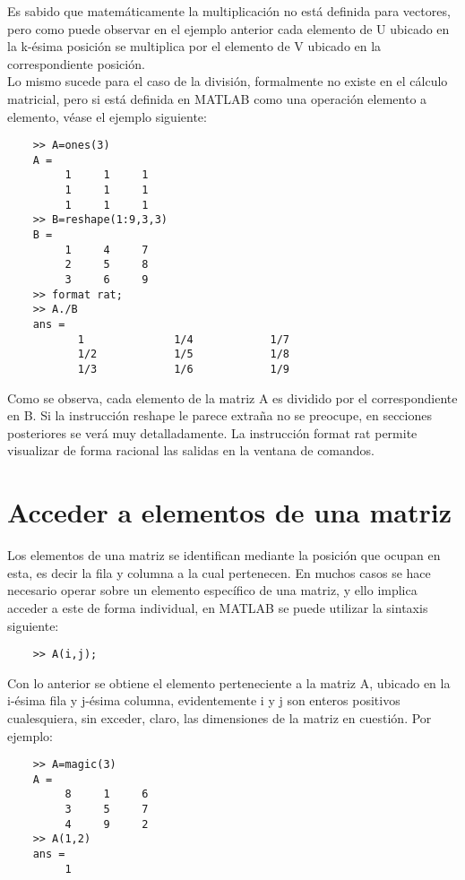 Es sabido que matemáticamente la multiplicación no está definida para vectores, pero como 
puede observar en el ejemplo anterior cada elemento de U ubicado en la k-ésima posición se 
multiplica por el elemento de V ubicado en la correspondiente posición.\\

Lo mismo sucede para el caso de la división, formalmente no existe en el cálculo matricial, 
pero si está definida en MATLAB como una operación elemento a elemento, véase el ejemplo siguiente:

\begin{verbatim}
 	>> A=ones(3)
	A =
	     1     1     1
	     1     1     1
	     1     1     1
	>> B=reshape(1:9,3,3)
	B =
	     1     4     7
	     2     5     8
	     3     6     9
	>> format rat;
	>> A./B
	ans =
	       1              1/4            1/7     
	       1/2            1/5            1/8     
	       1/3            1/6            1/9    
 \end{verbatim} 

Como se observa, cada elemento de la matriz A es dividido por el correspondiente en B. 
Si la instrucción reshape le parece extraña no se preocupe, en secciones posteriores 
se verá muy detalladamente. La instrucción format rat permite visualizar de forma 
racional las salidas en la ventana de comandos.


\section{Acceder a elementos de una matriz}

Los elementos de una matriz se identifican mediante la posición que ocupan en esta, 
es decir la fila y columna a la cual pertenecen. En muchos casos se hace necesario 
operar sobre un elemento específico de una matriz, y ello implica acceder a este de 
forma individual, en MATLAB se puede utilizar la sintaxis siguiente:
	
\begin{verbatim}
	>> A(i,j);
\end{verbatim}

Con lo anterior se obtiene el elemento perteneciente a la matriz A, ubicado en la 
i-ésima fila y j-ésima columna, evidentemente i y j son enteros positivos cualesquiera, 
sin exceder, claro, las dimensiones de la matriz en cuestión. Por ejemplo:

\begin{verbatim}
	>> A=magic(3)
	A =
	     8     1     6
	     3     5     7
	     4     9     2
	>> A(1,2)
	ans =
	     1
\end{verbatim}

